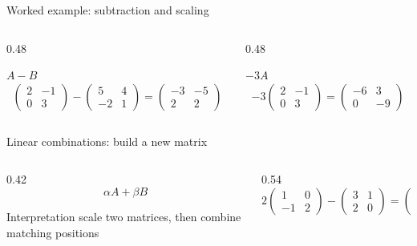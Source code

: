 \begin{frame}{Worked example: subtraction and scaling}
  \begin{columns}[T,onlytextwidth]
    \begin{column}{0.48\textwidth}
      \begin{block}{$A-B$}
        \[
        \begin{pmatrix}2&-1\\0&3\end{pmatrix}
        -
        \begin{pmatrix}5&4\\-2&1\end{pmatrix}
        =
        \begin{pmatrix}-3&-5\\2&2\end{pmatrix}
        \]
      \end{block}
    \end{column}
    \begin{column}{0.48\textwidth}
      \begin{exampleblock}{$-3A$}
        \[
        -3\begin{pmatrix}2&-1\\0&3\end{pmatrix}
        =
        \begin{pmatrix}-6&3\\0&-9\end{pmatrix}
        \]
      \end{exampleblock}
    \end{column}
  \end{columns}
\end{frame}

\begin{frame}{Linear combinations: build a new matrix}
  \begin{columns}[T,onlytextwidth]
    \begin{column}{0.42\textwidth}
      \[
      \alpha A+\beta B
      \]
      \begin{block}{Interpretation}
        scale two matrices, then combine matching positions
      \end{block}
    \end{column}
    \begin{column}{0.54\textwidth}
      \[
      2\begin{pmatrix}1&0\\-1&2\end{pmatrix}
      -
      \begin{pmatrix}3&1\\2&0\end{pmatrix}
      =
      \begin{pmatrix}-1&-1\\-4&4\end{pmatrix}
      \]
    \end{column}
  \end{columns}
\end{frame}
